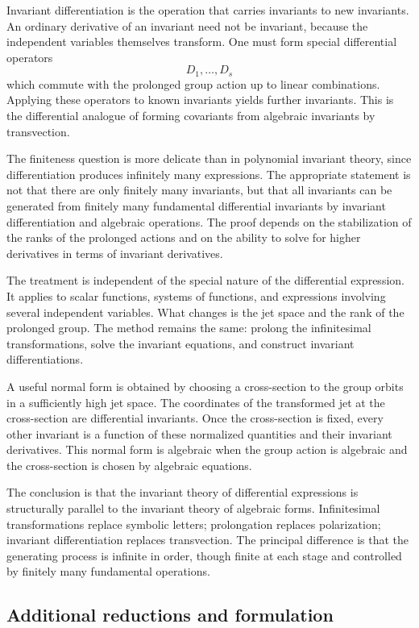 \documentclass[12pt]{article}
\begin{document}
Invariant differentiation is the operation that carries invariants to new invariants. An ordinary
derivative of an invariant need not be invariant, because the independent variables themselves
transform. One must form special differential operators \[   D_1, \ldots,D_s \] which commute with
the prolonged group action up to linear combinations. Applying these operators to known invariants
yields further invariants. This is the differential analogue of forming covariants from algebraic
invariants by transvection.


The finiteness question is more delicate than in polynomial invariant theory, since differentiation
produces infinitely many expressions. The appropriate statement is not that there are only finitely
many invariants, but that all invariants can be generated from finitely many fundamental
differential invariants by invariant differentiation and algebraic operations. The proof depends on
the stabilization of the ranks of the prolonged actions and on the ability to solve for higher
derivatives in terms of invariant derivatives.


The treatment is independent of the special nature of the differential expression. It applies to
scalar functions, systems of functions, and expressions involving several independent variables.
What changes is the jet space and the rank of the prolonged group. The method remains the same:
prolong the infinitesimal transformations, solve the invariant equations, and construct invariant
differentiations.


A useful normal form is obtained by choosing a cross-section to the group orbits in a sufficiently
high jet space. The coordinates of the transformed jet at the cross-section are differential
invariants. Once the cross-section is fixed, every other invariant is a function of these normalized
quantities and their invariant derivatives. This normal form is algebraic when the group action is
algebraic and the cross-section is chosen by algebraic equations.


The conclusion is that the invariant theory of differential expressions is structurally parallel to
the invariant theory of algebraic forms. Infinitesimal transformations replace symbolic letters;
prolongation replaces polarization; invariant differentiation replaces transvection. The principal
difference is that the generating process is infinite in order, though finite at each stage and
controlled by finitely many fundamental operations.


\subsection{Additional reductions and formulation}
\end{document}
